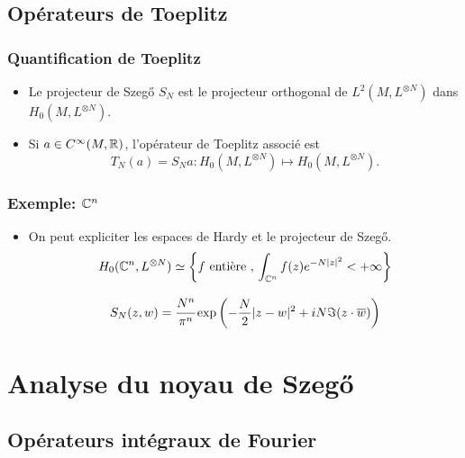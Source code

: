 \documentclass[mathserif]{beamer}
\begin{document}
\subsection{Op\'erateurs de Toeplitz}


  \begin{frame}
    \frametitle{Quantification de Toeplitz}
    \begin{defn}
      \begin{itemize}
      \item Le projecteur de Szeg\H{o} $S_N$ est le projecteur orthogonal de
      $L^2(M,L^{\otimes N})$ dans $H_0(M,L^{\otimes N})$.
    
    \item Si $a\in C^{\infty}(M,\mathbb{R})$, l'op\'erateur de Toeplitz
      associ\'e est \[T_N(a)=S_Na:H_0(M,L^{\otimes N})\mapsto
        H_0(M,L^{\otimes N}).\]
      \end{itemize}
    \end{defn}
  \end{frame}

  \begin{frame}
    \frametitle{Exemple: $\mathbb{C}^n$}
    \begin{itemize}
    \item 
    On peut expliciter les espaces de Hardy et le projecteur de
    Szeg\H{o}.
    \[H_0(\mathbb{C}^n,L^{\otimes N})\simeq \left\{f\text{ enti\`ere
        },\, \int_{\mathbb{C}^n}f(z)e^{-N|z|^2}<+\infty\right\}\]

      \[S_N(z,w)=\cfrac{N^n}{\pi^n}\exp\left(-\frac N2|z-w|^2+iN\Im(z\cdot \overline{w})\right)\]
\end{itemize}
    \end{frame}

    \section{Analyse du noyau de Szeg\H{o}}

\subsection{Op\'erateurs int\'egraux de Fourier}
\end{document}
